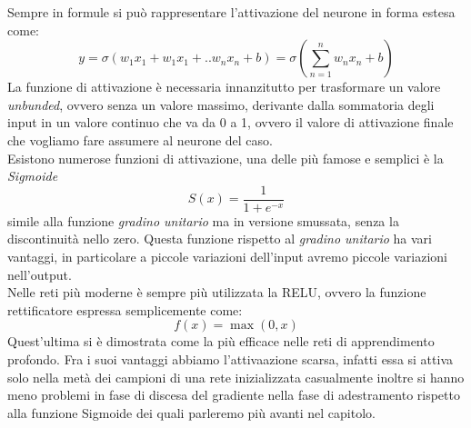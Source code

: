 \documentclass[12pt,a4paper,openright,twoside]{report}
\begin{document}
Sempre in formule si può rappresentare l'attivazione del neurone in forma estesa come: 
\begin{equation}
    y = \sigma(w_1  x_1 + w_1  x_1 + .. w_n  x_n + b) = \sigma(\sum_{n=1}^{n} w_n x_n + b)
\end{equation}
La funzione di attivazione è necessaria innanzitutto per trasformare un valore \emph{unbunded}, ovvero senza un valore massimo, derivante dalla sommatoria degli input in un valore continuo che va da 0 a 1, ovvero il valore di attivazione finale che vogliamo fare assumere al neurone del caso. \\
Esistono numerose funzioni di attivazione, una delle più famose e semplici è la \emph{Sigmoide} \[ S(x) = \frac{1}{1+e^{-x}}\] simile alla funzione \emph{gradino unitario} ma in versione smussata, senza la discontinuità nello zero. Questa funzione rispetto al \emph{gradino unitario} ha vari vantaggi, in particolare a piccole variazioni dell'input avremo piccole variazioni nell'output. \\
Nelle reti più moderne è sempre più utilizzata la RELU, ovvero la funzione rettificatore espressa semplicemente come: 
\begin{equation}
     f(x)=\max(0,x)
\end{equation}
Quest'ultima si è dimostrata come la più efficace nelle reti di apprendimento profondo. Fra i suoi vantaggi abbiamo l'attivaazione scarsa, infatti essa si attiva solo nella metà dei campioni di una rete inizializzata casualmente inoltre si hanno meno problemi in fase di discesa del gradiente nella fase di adestramento rispetto alla funzione Sigmoide dei quali parleremo più avanti nel capitolo.
\end{document}
